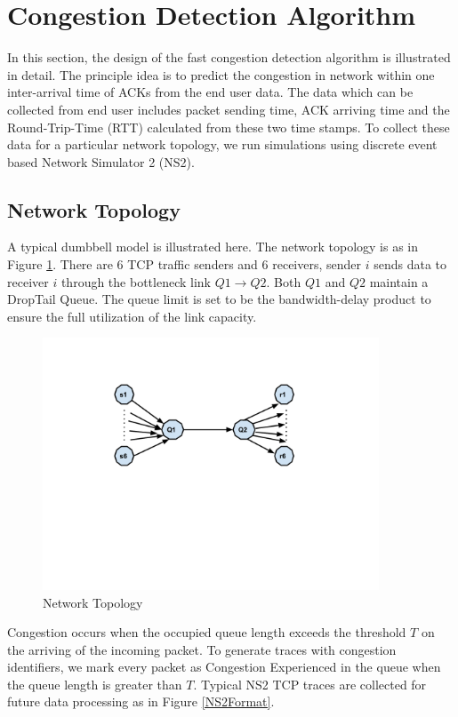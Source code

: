 \section{Congestion Detection Algorithm}
\label{Design}
In this section, the design of the fast congestion detection algorithm is illustrated in detail. The principle idea is to predict the congestion in network within one inter-arrival time of ACKs from the end user data. The data which can be collected from end user includes packet sending time, ACK arriving time and the Round-Trip-Time (RTT) calculated from these two time stamps. To collect these data for a particular network topology, we run simulations using discrete event based Network Simulator 2 (NS2). 
\subsection{Network Topology}
A typical dumbbell model is illustrated here. The network topology is as in Figure \ref{layout}. There are $6$ TCP traffic senders and $6$ receivers, sender $i$ sends data to receiver $i$ through the bottleneck link $Q1\to Q2$. Both $Q1$ and $Q2$ maintain a DropTail Queue. The queue limit is set to be the bandwidth-delay product to ensure the full utilization of the link capacity.

\begin{figure}
\centering
\includegraphics[width=10cm]{6layout.pdf}
\caption{Network Topology}
\label{layout}
\end{figure}
Congestion occurs when the occupied queue length exceeds the threshold $T$ on the arriving of the incoming packet. To generate traces with congestion identifiers, we mark every packet as Congestion Experienced in the queue when the queue length is greater than $T$. Typical NS2 TCP traces  \cite{TraceFormat} are collected for future data processing as in Figure \ref{NS2Format}. 

